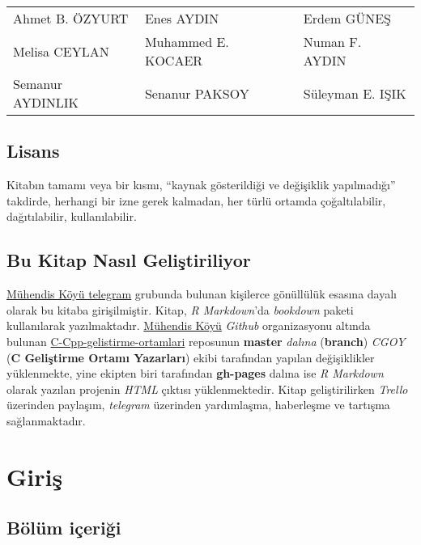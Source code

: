 \documentclass[
]{book}
\begin{document}
\begin{tabular}{l|l|l}
\hline
 &  & \\
\hline
Ahmet B. ÖZYURT & Enes AYDIN & Erdem GÜNEŞ\\
\hline
Melisa CEYLAN & Muhammed E. KOCAER & Numan F. AYDIN\\
\hline
Semanur AYDINLIK & Senanur PAKSOY & Süleyman E. IŞIK\\
\hline
\end{tabular}

\hypertarget{lisans}{%
\section{Lisans}\label{lisans}}

Kitabın tamamı veya bir kısmı, ``kaynak gösterildiği ve değişiklik yapılmadığı'' takdirde, herhangi bir izne gerek kalmadan, her türlü ortamda çoğaltılabilir, dağıtılabilir, kullanılabilir.

\hypertarget{bu-kitap-nasux131l-geliux15ftiriliyor}{%
\section{Bu Kitap Nasıl Geliştiriliyor}\label{bu-kitap-nasux131l-geliux15ftiriliyor}}

\href{https://t.me/koyumuhendis}{Mühendis Köyü telegram} grubunda bulunan kişilerce gönüllülük esasına dayalı olarak bu kitaba girişilmiştir. Kitap, \emph{R Markdown}'da \emph{bookdown} paketi kullanılarak yazılmaktadır. \href{https://github.com/MuhendisKoyu}{Mühendis Köyü} \emph{Github} organizasyonu altında bulunan \href{https://github.com/MuhendisKoyu/C-Cpp-gelistirme-ortamlari}{C-Cpp-gelistirme-ortamlari} reposunun \textbf{master} \emph{dalına} (\textbf{branch}) \emph{CGOY} (\textbf{C Geliştirme Ortamı Yazarları}) ekibi tarafından yapılan değişiklikler yüklenmekte, yine ekipten biri tarafından \textbf{gh-pages} dalına ise \emph{R Markdown} olarak yazılan projenin \emph{HTML} çıktısı yüklenmektedir. Kitap geliştirilirken \emph{Trello} üzerinden paylaşım, \emph{telegram} üzerinden yardımlaşma, haberleşme ve tartışma sağlanmaktadır.

\hypertarget{giriux15f}{%
\chapter{Giriş}\label{giriux15f}}

\hypertarget{buxf6luxfcm-iuxe7eriux11fi}{%
\section{Bölüm içeriği}\label{buxf6luxfcm-iuxe7eriux11fi}}
\end{document}
